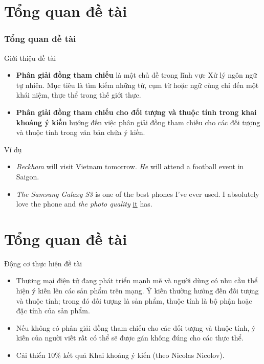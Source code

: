 \documentclass[9pt,xcolor=table,hyperref=unicode]{beamer}
\begin{document}
	\section{Tổng quan đề tài}
	\begin{frame}
		\frametitle{Tổng quan đề tài}
		\begin{block}{Giới thiệu đề tài}
			\begin{itemize}
				\item{\textbf{Phân giải đồng tham chiếu} là một chủ đề trong lĩnh vực Xử lý ngôn ngữ tự nhiên. Mục tiêu là tìm kiếm những từ, cụm từ hoặc ngữ cùng chỉ đến một khái niệm, thực thể trong thế giới thực.}
				\item{\textbf{Phân giải đồng tham chiếu cho đối tượng và thuộc tính trong khai khoáng ý kiến} hướng đến việc phân giải đồng tham chiếu cho các đối tượng và thuộc tính trong văn bản chứa ý kiến.}
			\end{itemize}
		\end{block}		

		\begin{block}{Ví dụ}
		\begin{itemize}
			\item{\textit{Beckham} will visit Vietnam tomorrow. \textit{He} will attend a football event in Saigon.}
			\item{\textit{The Samsung Galaxy S3} is one of the best phones I’ve ever used. I absolutely
love the phone and \textit{the photo quality} \underline{it} has.}
		\end{itemize}
		\end{block}		
	\end{frame}


	\section{Tổng quan đề tài}
	\begin{frame}
		\begin{block}{Động cơ thực hiện đề tài}
			\begin{itemize}	
				\item{Thương mại điện tử đang phát triển mạnh mẽ và người dùng có nhu cầu thể hiện ý kiến lên các sản phẩm trên mạng. Ý kiến thường hướng đến đối tượng và thuộc tính; trong đó đối tượng là sản phẩm, thuộc tính là bộ phận hoặc đặc tính của sản phẩm.}
				\item{Nếu không có phân giải đồng tham chiếu cho các đối tượng và thuộc tính, ý kiến của người viết rất có thể sẽ được gán không đúng cho các thực thể.}
				\item{Cải thiển 10\% kết quả Khai khoáng ý kiến (theo Nicolas Nicolov).}
			\end{itemize}		
		\end{block}		
	\end{frame}
\end{document}
